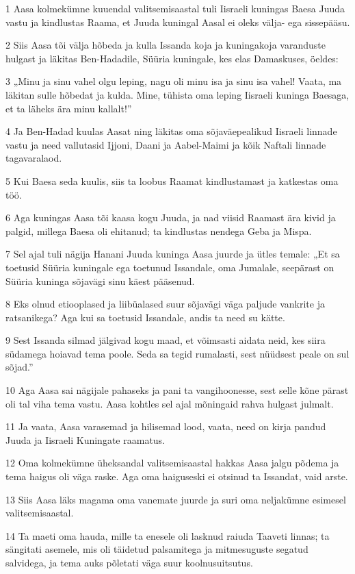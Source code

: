 \par 1 Aasa kolmekümne kuuendal valitsemisaastal tuli Iisraeli kuningas Baesa Juuda vastu ja kindlustas Raama, et Juuda kuningal Aasal ei oleks välja- ega sissepääsu.
\par 2 Siis Aasa tõi välja hõbeda ja kulla Issanda koja ja kuningakoja varanduste hulgast ja läkitas Ben-Hadadile, Süüria kuningale, kes elas Damaskuses, öeldes:
\par 3 „Minu ja sinu vahel olgu leping, nagu oli minu isa ja sinu isa vahel! Vaata, ma läkitan sulle hõbedat ja kulda. Mine, tühista oma leping Iisraeli kuninga Baesaga, et ta läheks ära minu kallalt!”
\par 4 Ja Ben-Hadad kuulas Aasat ning läkitas oma sõjaväepealikud Iisraeli linnade vastu ja need vallutasid Ijjoni, Daani ja Aabel-Maimi ja kõik Naftali linnade tagavaralaod.
\par 5 Kui Baesa seda kuulis, siis ta loobus Raamat kindlustamast ja katkestas oma töö.
\par 6 Aga kuningas Aasa tõi kaasa kogu Juuda, ja nad viisid Raamast ära kivid ja palgid, millega Baesa oli ehitanud; ta kindlustas nendega Geba ja Mispa.
\par 7 Sel ajal tuli nägija Hanani Juuda kuninga Aasa juurde ja ütles temale: „Et sa toetusid Süüria kuningale ega toetunud Issandale, oma Jumalale, seepärast on Süüria kuninga sõjavägi sinu käest pääsenud.
\par 8 Eks olnud etiooplased ja liibüalased suur sõjavägi väga paljude vankrite ja ratsanikega? Aga kui sa toetusid Issandale, andis ta need su kätte.
\par 9 Sest Issanda silmad jälgivad kogu maad, et võimsasti aidata neid, kes siira südamega hoiavad tema poole. Seda sa tegid rumalasti, sest nüüdsest peale on sul sõjad.”
\par 10 Aga Aasa sai nägijale pahaseks ja pani ta vangihoonesse, sest selle kõne pärast oli tal viha tema vastu. Aasa kohtles sel ajal mõningaid rahva hulgast julmalt.
\par 11 Ja vaata, Aasa varasemad ja hilisemad lood, vaata, need on kirja pandud Juuda ja Iisraeli Kuningate raamatus.
\par 12 Oma kolmekümne üheksandal valitsemisaastal hakkas Aasa jalgu põdema ja tema haigus oli väga raske. Aga oma haiguseski ei otsinud ta Issandat, vaid arste.
\par 13 Siis Aasa läks magama oma vanemate juurde ja suri oma neljakümne esimesel valitsemisaastal.
\par 14 Ta maeti oma hauda, mille ta enesele oli lasknud raiuda Taaveti linnas; ta sängitati asemele, mis oli täidetud palsamitega ja mitmesuguste segatud salvidega, ja tema auks põletati väga suur koolnusuitsutus.

